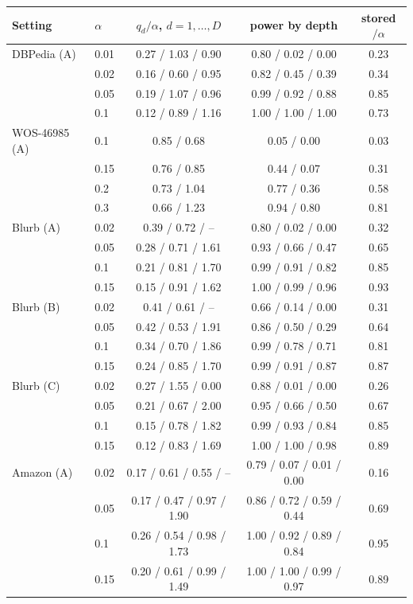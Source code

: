 \begin{tabular}{llccc}
\toprule
Setting & $\alpha$ & $q_d/\alpha$, $d=1,\dots,D$ & power by depth & stored$/\alpha$ \\
\midrule
DBPedia (A) & 0.01 & 0.27 / 1.03 / 0.90 & 0.80 / 0.02 / 0.00 & 0.23 \\
 & 0.02 & 0.16 / 0.60 / 0.95 & 0.82 / 0.45 / 0.39 & 0.34 \\
 & 0.05 & 0.19 / 1.07 / 0.96 & 0.99 / 0.92 / 0.88 & 0.85 \\
 & 0.1 & 0.12 / 0.89 / 1.16 & 1.00 / 1.00 / 1.00 & 0.73 \\
\addlinespace
WOS-46985 (A) & 0.1 & 0.85 / 0.68 & 0.05 / 0.00 & 0.03 \\
 & 0.15 & 0.76 / 0.85 & 0.44 / 0.07 & 0.31 \\
 & 0.2 & 0.73 / 1.04 & 0.77 / 0.36 & 0.58 \\
 & 0.3 & 0.66 / 1.23 & 0.94 / 0.80 & 0.81 \\
\addlinespace
Blurb (A) & 0.02 & 0.39 / 0.72 / -- & 0.80 / 0.02 / 0.00 & 0.32 \\
 & 0.05 & 0.28 / 0.71 / 1.61 & 0.93 / 0.66 / 0.47 & 0.65 \\
 & 0.1 & 0.21 / 0.81 / 1.70 & 0.99 / 0.91 / 0.82 & 0.85 \\
 & 0.15 & 0.15 / 0.91 / 1.62 & 1.00 / 0.99 / 0.96 & 0.93 \\
\addlinespace
Blurb (B) & 0.02 & 0.41 / 0.61 / -- & 0.66 / 0.14 / 0.00 & 0.31 \\
 & 0.05 & 0.42 / 0.53 / 1.91 & 0.86 / 0.50 / 0.29 & 0.64 \\
 & 0.1 & 0.34 / 0.70 / 1.86 & 0.99 / 0.78 / 0.71 & 0.81 \\
 & 0.15 & 0.24 / 0.85 / 1.70 & 0.99 / 0.91 / 0.87 & 0.87 \\
\addlinespace
Blurb (C) & 0.02 & 0.27 / 1.55 / 0.00 & 0.88 / 0.01 / 0.00 & 0.26 \\
 & 0.05 & 0.21 / 0.67 / 2.00 & 0.95 / 0.66 / 0.50 & 0.67 \\
 & 0.1 & 0.15 / 0.78 / 1.82 & 0.99 / 0.93 / 0.84 & 0.85 \\
 & 0.15 & 0.12 / 0.83 / 1.69 & 1.00 / 1.00 / 0.98 & 0.89 \\
\addlinespace
Amazon (A) & 0.02 & 0.17 / 0.61 / 0.55 / -- & 0.79 / 0.07 / 0.01 / 0.00 & 0.16 \\
 & 0.05 & 0.17 / 0.47 / 0.97 / 1.90 & 0.86 / 0.72 / 0.59 / 0.44 & 0.69 \\
 & 0.1 & 0.26 / 0.54 / 0.98 / 1.73 & 1.00 / 0.92 / 0.89 / 0.84 & 0.95 \\
 & 0.15 & 0.20 / 0.61 / 0.99 / 1.49 & 1.00 / 1.00 / 0.99 / 0.97 & 0.89 \\
\bottomrule
\end{tabular}
